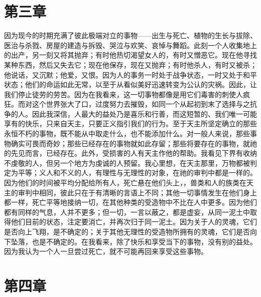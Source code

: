 
\section{第三章}

因为现今的时期充满了彼此极端对立的事物——出生与死亡、植物的生长与拔除、医治与杀戮、房屋的建造与拆毁、哭泣与欢笑、哀悼与舞蹈。此刻一个人收集地上的出产，另一刻又将其抛弃；有时他热切渴望女人的，有时又憎恶它。现在他寻找某种东西，然后又失去它；现在他保存，现在又抛弃；有时他杀人，有时又被杀；他说话，又沉默；他爱，又恨。因为人的事务一时处于战争状态，一时又处于和平状态；他们的命运如此无常，以至于从看似美好迅速转变为公认的灾祸。因此，让我们停止徒劳的劳苦。因为在我看来，这一切事物都像是用它们毒害的刺使人疯狂。而对这个世界张大了口，过度努力去摧毁，如同一个从起初到末了选择与之抗争的人。因此我深信，人最大的益处乃是喜乐和行善，而这短暂的、我们唯一可能享有的快乐，只来自天主，只要正义指引我们的行为。至于天主所坚定确立的那些永恒不朽的事物，既不能从中取走什么，也不能添加什么。对一般人来说，那些事物确实可畏而奇妙；那些已经存在的事物就如此存留；那些将要存在的事物，就祂的先见而言，已经存在。此外，受损害的人有天主作他的帮助。我看见下界有收纳不虔敬的人，但另一个地方为虔诚的人预留。我心里想，在天主那里，万物都被判定为平等；义人和不义的人，有理性与无理性的对象，在祂的审判中都是一样的。因为他们的时间被平均分配给所有人，死亡悬在他们头上，，兽类和人的族类在天主的审判中相同，彼此只在于有清晰的言语上不同；其他一切事情发生在他们身上都一样，死亡平等地接纳一切，在其他种类的受造物中不比在人中更多。因为他们都有同样的气息，人并不更多；但一切，一言以蔽之，都是虚妄，从同一泥土中取得他们目前的状态，注定要消亡，并再次归于同一泥土。因为关于人的灵魂，它们是否向上飞翔，是不确定的；关于其他无理性的受造物所拥有的灵魂，它们是否向下坠落，也是不确定的。在我看来，除了快乐和享受当下的事物，没有别的益处。因为我认为一个人一旦尝过死亡，就不可能再回来享受这些事物。\par


\section{第四章}

